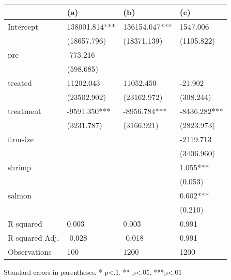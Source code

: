 \begin{table}
\caption{}
\label{}
\begin{center}
\begin{tabular}{llll}
\hline
               & (a)           & (b)           & (c)           \\
\hline
Intercept      & 138001.814*** & 136154.047*** & 1547.006      \\
               & (18657.796)   & (18371.139)   & (1105.822)    \\
pre            & -773.216      &               &               \\
               & (598.685)     &               &               \\
treated        & 11202.043     & 11052.450     & -21.902       \\
               & (23502.902)   & (23162.972)   & (308.244)     \\
treatment      & -9591.350***  & -8956.784***  & -8436.282***  \\
               & (3231.787)    & (3166.921)    & (2823.973)    \\
firmsize       &               &               & -2119.713     \\
               &               &               & (3406.960)    \\
shrimp         &               &               & 1.055***      \\
               &               &               & (0.053)       \\
salmon         &               &               & 0.602***      \\
               &               &               & (0.210)       \\
R-squared      & 0.003         & 0.003         & 0.991         \\
R-squared Adj. & -0.028        & -0.018        & 0.991         \\
Observations   & 100           & 1200          & 1200          \\
\hline
\end{tabular}
\end{center}
\end{table}
\bigskip
Standard errors in parentheses. \newline 
* p<.1, ** p<.05, ***p<.01